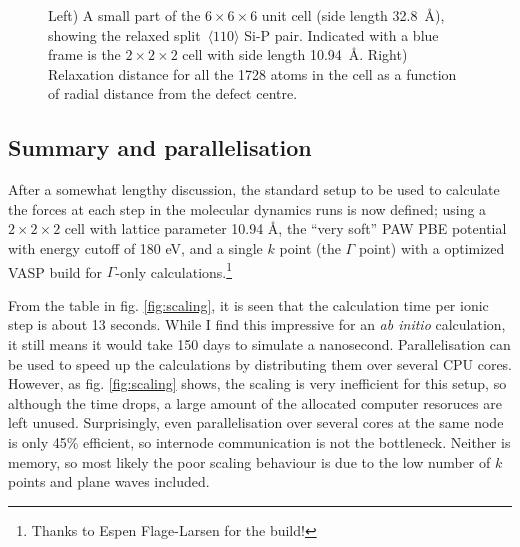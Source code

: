 \documentclass[11pt,bibliography=totoc,index=totoc]{scrbook}   %
\begin{document}
\begin{figure}[htp]
  \centering
  \caption{Left) A small part of the $6\times 6\times 6$ unit cell (side length 32.8~Å), showing the 
  relaxed split~$\langle 110 \rangle$ Si-P pair.
  Indicated with a blue frame is the $2\times 2\times 2$ cell with side length 10.94~Å.
  Right) Relaxation distance for all the 1728 atoms in the cell as a function of radial distance from the defect centre.}
  \label{fig:tests/cellsize}
\end{figure}

%
\subsection{Summary and parallelisation}\label{sec:parameters:summary}
%

After a somewhat lengthy discussion, the standard setup to be used to calculate the forces at each step in the molecular dynamics runs is now defined; using a $2\times 2\times 2$ cell with lattice parameter 10.94 Å, the ``very soft'' PAW PBE potential with energy cutoff of 180 eV, and a single $k$ point (the $\Gamma$ point) with a optimized VASP build for $\Gamma$-only calculations.\footnote{Thanks to Espen Flage-Larsen for the build!} 

From the table in fig. \ref{fig:scaling}, it is seen that the calculation time per ionic step is about 13 seconds. 
While I find this impressive for an \textit{ab initio} calculation, it still means it would take 150 days to simulate a nanosecond.
Parallelisation can be used to speed up the calculations by distributing them over several CPU cores.
However, as fig. \ref{fig:scaling} shows, the scaling is very inefficient for this setup, so although the time drops, a large amount of the allocated computer resoruces are left unused. 
Surprisingly, even parallelisation over several cores at the same node is only 45\% efficient, so internode communication is not the bottleneck. 
Neither is memory, so most likely the poor scaling behaviour is due to the low number of $k$ points and plane waves included. 


\end{document}
